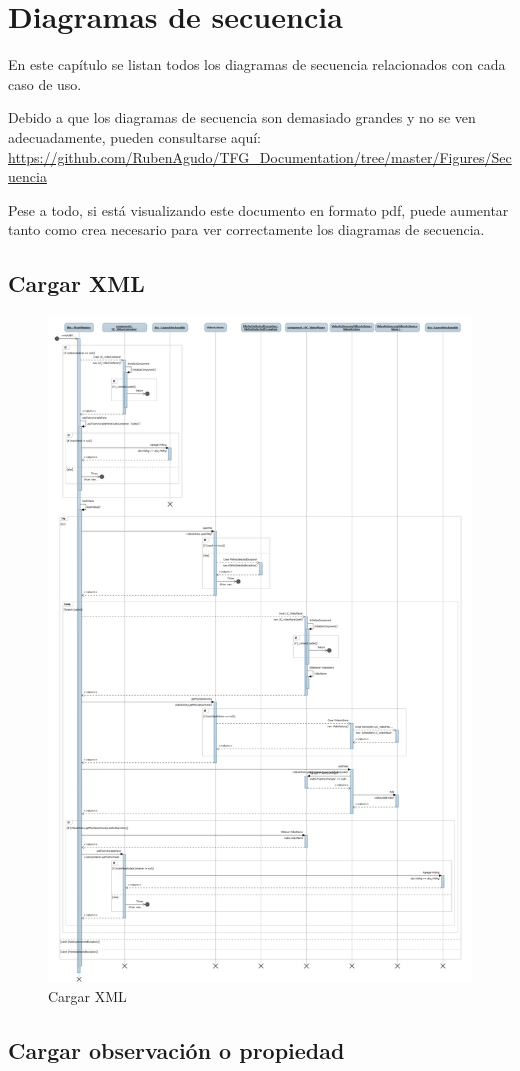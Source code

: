 \chapter{Diagramas de secuencia}
En este cap\'itulo se listan todos los diagramas de secuencia
relacionados con cada caso de uso.

Debido a que los diagramas de secuencia son demasiado grandes y
no se ven adecuadamente, pueden consultarse aqu\'i: 
\url{https://github.com/RubenAgudo/TFG_Documentation/tree/master/Figures/Secuencia}

Pese a todo, si est\'a visualizando este documento en formato pdf, puede aumentar
tanto como crea necesario para ver correctamente los diagramas de secuencia.

\cleardoublepage
\section{Cargar XML}

\begin{figure}[H]
\centering
\includegraphics[width=0.6\linewidth]{./Figures/Secuencia/CargarXML.png}
\caption{Cargar XML}
\label{fig:CargarXML}
\end{figure}


\section{Cargar observaci\'on o propiedad}

